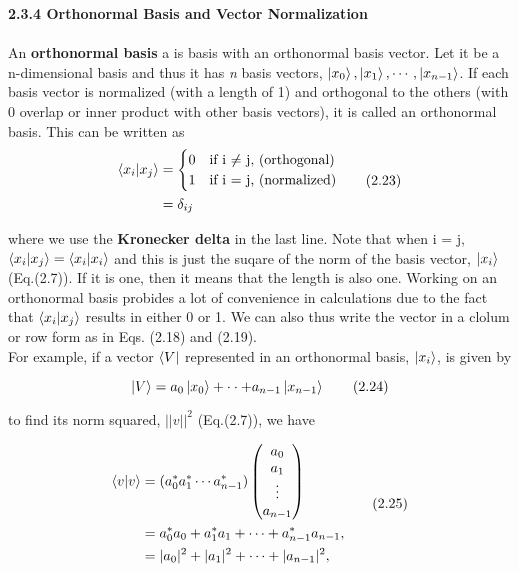 \documentclass{article}
\begin{document}
\textbf{\large 2.3.4 Orthonormal Basis and Vector Normalization}
\\
\\
An \textbf{orthonormal basis} a is basis with an orthonormal basis vector.
Let it be a n-dimensional basis and thus it has \textit{n} basis vectors, 
$\ket{x_{0}},\ket{x_{1}},\cdots,\ket{x_{n-1}}$. If each basis vector is normalized (with a length of 1) and orthogonal
to the others (with 0 overlap or inner product with other basis vectors), it is called an orthonormal basis.
This can be written as
\begin{align}
    \begin{split}
    \braket{x_{i}|x_{j}}&= \begin{cases}
        0 & \text{if i $\neq$  j, (orthogonal)}\\
        1 & \text{if i = j, (normalized)}
    \end{cases}\\
    & =\delta_{ij}
    \end{split} \tag{2.23}
\end{align}

where we use the \textbf{Kronecker delta} in the last line. Note that when i = j, $\braket{x_{i}|x_{j}} = \braket{x_{i}|x_{i}}$ and
this is just the suqare of the norm of the basis vector, $\ket{x_{i}}$ (Eq.(2.7)). If it is one, then it means that the length is also one. Working
on an orthonormal basis probides a lot of convenience in calculations due to the fact that $\braket{x_{i}|x_{j}}$ results in either 0 or 1. 
We can also thus write the vector in a clolum or row form as in Eqs. (2.18) and (2.19).\\
For example, if a vector $\bra{V}$ represented in an orthonormal basis, $\ket{x_{i}}$, is given by

\begin{equation}
    \ket{V}=a_{0}\ket{x_{0}}+\cdot\cdot+a_{n-1}\ket{x_{n-1}} \tag{2.24}
\end{equation}

to find its norm squared, $||v||^2$ (Eq.(2.7)), we have

\begin{align}
    \begin{split}
        \braket{v|v}&=(a_{0}^*a_{1}^*\cdots a_{n-1}^*)
        \begin{pmatrix}
         a_{0}\\
         a_{1}\\
         \vdots \\
         a_{n-1}   
        \end{pmatrix}\\
        &=a_{0}^*a_{0}+a_{1}^*a_{1}+\dots+a_{n-1}^*a_{n-1}, \\
        &=|a_{0}|^2+|a_{1}|^2+\dots+|a_{n-1}|^2,
    \end{split} \tag{2.25}
\end{align} 
\end{document}
